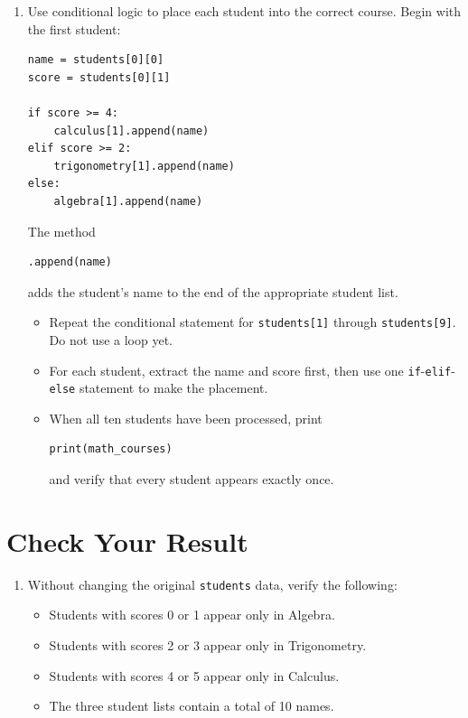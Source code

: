 \documentclass{article}
\begin{document}
\begin{enumerate}

\item Use conditional logic to place each student into the
correct course.  Begin with the first student:

\begin{verbatim}
name = students[0][0]
score = students[0][1]

if score >= 4:
    calculus[1].append(name)
elif score >= 2:
    trigonometry[1].append(name)
else:
    algebra[1].append(name)
\end{verbatim}

The method

\begin{verbatim}
.append(name)
\end{verbatim}

adds the student's name to the end of the appropriate
student list.

\begin{itemize}

\item Repeat the conditional statement for
\texttt{students[1]} through \texttt{students[9]}.
Do not use a loop yet.

\item For each student, extract the name and score first,
then use one \texttt{if}-\texttt{elif}-\texttt{else}
statement to make the placement.

\item When all ten students have been processed, print

\begin{verbatim}
print(math_courses)
\end{verbatim}

and verify that every student appears exactly once.

\end{itemize}

\end{enumerate}


\section{Check Your Result}

\begin{enumerate}

\item Without changing the original \texttt{students} data,
verify the following:

\begin{itemize}
\item Students with scores 0 or 1 appear only in Algebra.
\item Students with scores 2 or 3 appear only in Trigonometry.
\item Students with scores 4 or 5 appear only in Calculus.
\item The three student lists contain a total of 10 names.
\end{itemize}

\end{enumerate}
\end{document}
